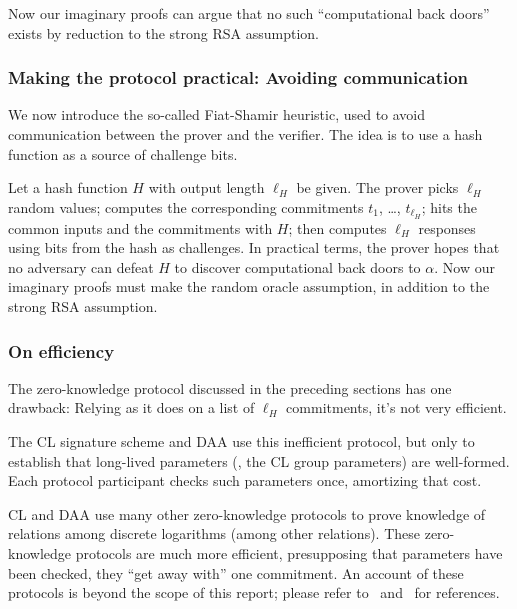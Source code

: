 Now our imaginary proofs can argue that no such ``computational
back doors'' exists by reduction to the strong RSA assumption.

\subsubsection{Making the protocol practical: Avoiding communication}

We now introduce the so-called Fiat-Shamir heuristic, used to avoid
communication between the prover and the verifier.
The idea is to use a hash function as a source of challenge bits.

Let a hash function $H$ with output length $\ell_H$ be given.
The prover picks $\ell_H$ random values; computes the corresponding
commitments $t_1$, \ldots, $t_{\ell_H}$;
hits the common inputs and the commitments with $H$;
then computes $\ell_H$ responses using bits from
the hash as challenges. In practical terms, the prover hopes
that no adversary can defeat $H$ to discover
computational back doors to $\alpha$. Now our imaginary proofs must
make the random oracle assumption, in addition to the strong
RSA assumption.

\subsubsection{On efficiency}

The zero-knowledge protocol discussed in the preceding sections has one
drawback: Relying as it does on a list of $\ell_H$ commitments, it's not
very efficient.

The CL signature scheme and DAA use this inefficient protocol,
but only to establish that long-lived parameters (\eg, the CL group
parameters) are well-formed.
Each protocol participant checks such parameters once, amortizing that cost.

CL and DAA use many other zero-knowledge protocols to prove knowledge
of relations among discrete logarithms (among other relations).
These zero-knowledge protocols
are much more efficient, presupposing that parameters have been
checked, they ``get away with'' one commitment.
An account of these protocols is beyond the scope of this report;
please refer to~\cite[\S\/5]{cl} and~\cite[\S\/3.2]{daa} for references.
